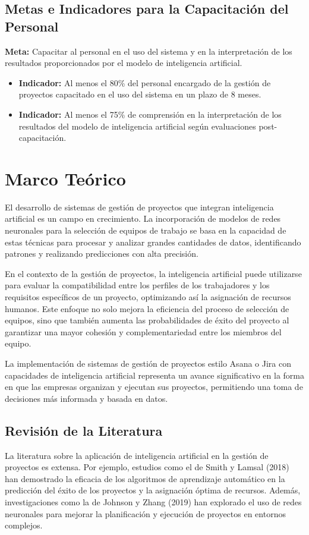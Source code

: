 \documentclass{article}
\begin{document}
    \subsection{Metas e Indicadores para la Capacitación del Personal}
    \textbf{Meta:} Capacitar al personal en el uso del sistema y en la interpretación de los resultados proporcionados por el modelo de inteligencia artificial.
    \begin{itemize}
        \item \textbf{Indicador:} Al menos el 80\% del personal encargado de la gestión de proyectos capacitado en el uso del sistema en un plazo de 8 meses.
        \item \textbf{Indicador:} Al menos el 75\% de comprensión en la interpretación de los resultados del modelo de inteligencia artificial según evaluaciones post-capacitación.
    \end{itemize}


    \section{Marco Teórico}
    El desarrollo de sistemas de gestión de proyectos que integran inteligencia artificial es un campo en crecimiento. La incorporación de modelos de redes neuronales para la selección de equipos de trabajo se basa en la capacidad de estas técnicas para procesar y analizar grandes cantidades de datos, identificando patrones y realizando predicciones con alta precisión.
    
    En el contexto de la gestión de proyectos, la inteligencia artificial puede utilizarse para evaluar la compatibilidad entre los perfiles de los trabajadores y los requisitos específicos de un proyecto, optimizando así la asignación de recursos humanos. Este enfoque no solo mejora la eficiencia del proceso de selección de equipos, sino que también aumenta las probabilidades de éxito del proyecto al garantizar una mayor cohesión y complementariedad entre los miembros del equipo.
    
    La implementación de sistemas de gestión de proyectos estilo Asana o Jira con capacidades de inteligencia artificial representa un avance significativo en la forma en que las empresas organizan y ejecutan sus proyectos, permitiendo una toma de decisiones más informada y basada en datos.
    
    \subsection{Revisión de la Literatura}
    La literatura sobre la aplicación de inteligencia artificial en la gestión de proyectos es extensa. Por ejemplo, estudios como el de Smith y Lamsal (2018) han demostrado la eficacia de los algoritmos de aprendizaje automático en la predicción del éxito de los proyectos y la asignación óptima de recursos. Además, investigaciones como la de Johnson y Zhang (2019) han explorado el uso de redes neuronales para mejorar la planificación y ejecución de proyectos en entornos complejos.
    
\end{document}
